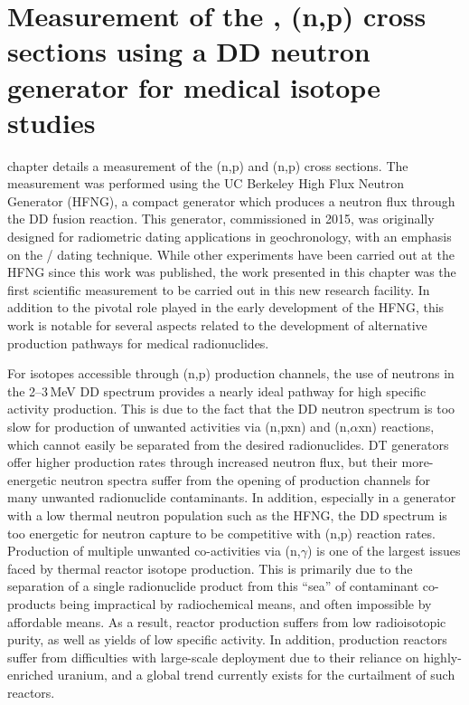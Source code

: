 \chapter{Measurement of the \texorpdfstring{, }{64Zn, 47Ti}(n,p) cross sections using a DD neutron generator for medical isotope studies}\label{sec:chapter_hfng}


 chapter details a measurement of the (n,p) and (n,p) cross sections.
The measurement was performed using the UC Berkeley High Flux Neutron Generator (HFNG), a compact generator which produces a neutron flux through the DD fusion reaction.
This generator, commissioned in 2015, was originally designed for radiometric dating applications in geochronology, with an emphasis on the / dating technique.
While other experiments have been carried out at the HFNG since this work was published, the work presented in this chapter was the first scientific measurement to be carried out in this new research facility.
In addition to the pivotal role played in the early development of the HFNG, this work is notable for several aspects related to the development of alternative production pathways for medical radionuclides.

For isotopes accessible through (n,p) production channels, the use of neutrons in the 2--3\,MeV DD spectrum provides a nearly ideal pathway for high specific activity production.
This is due to the fact that the DD neutron spectrum is too slow for production of unwanted activities via (n,pxn) and (n,$\alpha$xn) reactions, which cannot easily be separated from the desired radionuclides. 
DT generators offer higher production rates through increased  neutron flux, but their more-energetic neutron spectra suffer from the opening of production channels for many unwanted radionuclide contaminants.
In addition, especially in a generator with a low thermal neutron population such as the HFNG, the DD spectrum is too energetic for  neutron capture to be competitive with (n,p) reaction rates.
Production of multiple unwanted co-activities via (n,$\gamma$) is one of the largest issues faced by thermal reactor isotope production.
This is primarily due to the separation of a single radionuclide product from this \enquote{sea} of contaminant co-products being impractical by radiochemical means, and often impossible by affordable means.
As a result, reactor production suffers from low radioisotopic purity, as well as yields of low specific activity.
In addition, production reactors suffer from difficulties with large-scale deployment due to their reliance on highly-enriched uranium, and  a global trend currently exists for the curtailment of such reactors.


